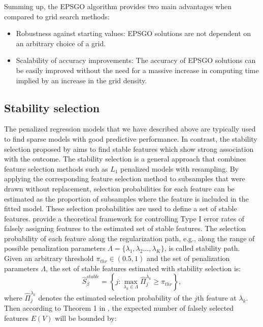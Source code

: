 \documentclass[]{jss}
\begin{document}
Summing up, the EPSGO algorithm provides two main advantages when compared to grid search methods: 
\begin{itemize}
\item Robustness against starting values: EPSGO solutions are not dependent on an arbitrary choice of a grid.
\item Scalability of accuracy improvements: The accuracy of EPSGO solutions can be easily improved without the need for a massive increase in computing time implied by an increase in the grid density.
\end{itemize}

\subsection{Stability selection}
The penalized regression models that we have described above are typically used to find sparse models with good predictive performance. In contrast, the stability selection proposed by \citet{MeinshausenBuehlmann2010} aims to find stable features which show strong association with the outcome. 
The stability selection is a general approach that combines feature selection methods such as $L_1$ penalized models with resampling. By applying the corresponding feature selection method to subsamples that were drawn without replacement, selection probabilities for each feature can be estimated as the proportion of subsamples where the feature is included in the fitted model. These selection probabilities are used to define a set of stable features. \citet{MeinshausenBuehlmann2010} provide a theoretical framework for controlling Type I error rates of falsely assigning features to the estimated set of stable features. The selection probability of each feature along the regularization path, e.g., along the range of possible penalization parameters $\Lambda=\{\lambda_1,\lambda_2...,\lambda_K\}$, is called stability path.
Given an arbitrary threshold $\pi_{thr} \in (0.5,1)$ and the set of penalization parameters $\Lambda$, the set of stable features estimated with stability selection is:
\begin{equation} 
 \hat{S}_{\beta}^{stable}=\left\{j: \max_{\lambda_{k} \in \Lambda} \hat{\Pi}_{j}^{\lambda_{k}} \geq \pi_{thr} \right\},
\end{equation}
where $\hat{\Pi}_{j}^{\lambda_{k}}$ denotes the estimated selection probability of the $j$th feature at $\lambda_k$. 
Then according to Theorem 1 in \citet{MeinshausenBuehlmann2010}, the expected number of falsely selected features $E(V)$ will be bounded by:
\end{document}
